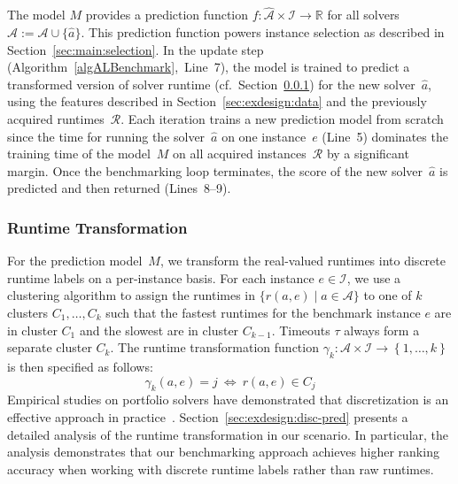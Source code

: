 \documentclass[sn-basic, Numbered]{sn-jnl} %
\begin{document}
The model $M$ provides a prediction function $f : \mathcal{\hat A} \times \mathcal{I} \rightarrow \mathbb{R}$ for all solvers $\mathcal{\hat A} := \mathcal{A} \cup \lbrace \hat a \rbrace$.
This prediction function powers instance selection as described in Section~\ref{sec:main:selection}.
In the update step (Algorithm~\ref{algALBenchmark},~Line~7), the model is trained to predict a transformed version of solver runtime (cf.~Section~\ref{sec:main:model:transformation}) for the new solver~$\hat{a}$, using the features described in Section~\ref{sec:exdesign:data} and the previously acquired runtimes~$\mathcal{R}$.
Each iteration trains a new prediction model from scratch since the time for running the solver~$\hat{a}$ on one instance~$e$ (Line~5) dominates the training time of the model~$M$ on all acquired instances~$\mathcal{R}$ by a significant margin.
Once the benchmarking loop terminates, the score of the new solver~$\hat{a}$ is predicted and then returned (Lines~8--9).

\subsubsection{Runtime Transformation}
\label{sec:main:model:transformation}

For the prediction model~$M$, we transform the real-valued runtimes into discrete runtime labels on a per-instance basis.
For each instance $e \in \mathcal{I}$, we use a clustering algorithm to assign the runtimes in $\bigl\{ r(a, e) \mid a \in \mathcal{A} \bigr\}$ to one of $k$ clusters $C_1, \dots, C_k$ such that the fastest runtimes for the benchmark instance $e$ are in cluster $C_1$ and the slowest are in cluster $C_{k-1}$.
Timeouts $\tau$ always form a separate cluster $C_{k}$.
The runtime transformation function $\gamma_k : {\mathcal{A} \times \mathcal{I}} \rightarrow \left\lbrace 1, \dots, k \right\rbrace$ is then specified as follows:
%
$$\gamma_k(a, e) = j ~\Leftrightarrow~ r(a, e) \in C_j$$
%
Empirical studies on portfolio solvers have demonstrated that discretization is an effective approach in practice~\cite{CollauttiMMO13,NgokoCT19}.
Section~\ref{sec:exdesign:disc-pred} presents a detailed analysis of the runtime transformation in our scenario.
In particular, the analysis demonstrates that our benchmarking approach achieves higher ranking accuracy when working with discrete runtime labels rather than raw runtimes.
\end{document}
